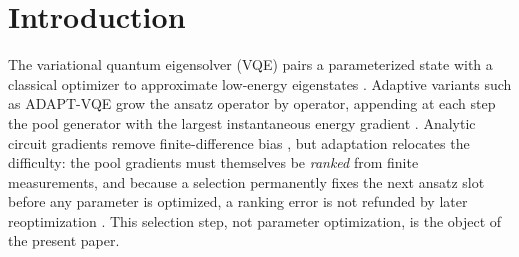 \documentclass[aps,pra,reprint,superscriptaddress,nofootinbib,floatfix]{revtex4-2}
\newcommand{\Cl}{\mathrm{Cl}}
\newcommand{\C}{\mathbb{C}}
\begin{document}
\begin{abstract}
and QWC grouping cut measured units per step from $42$ to $6$; grouping alone cuts circuit executions $2.8$--$3.6\times$ at unchanged accuracy. On molecules a FAST-inspired determinant-population proxy is intrinsically misaligned with the commutator gradient---its infinite-shot top pick on near-equilibrium H$_4$ carries $8\times10^{-7}$ of the maximum---and plateaus at $33.89$~mHa, above the random arm's median, whereas an exact-gradient baseline reaches $0.393$~mHa. The implementation is a sparse operator-centric realization of the complex Clifford algebra $\Cl(2n,\C)\cong M(2^n,\C)$, which supplies a uniform typed representation rather than additional expressivity. We claim no asymptotic speedup; the contribution is a reproducible, statistically calibrated account of when finite-shot adaptive selection can be certified and when proxy bias cannot be repaired by more measurement.
\end{abstract}

\maketitle

\section{Introduction}
\label{sec:intro}

The variational quantum eigensolver (VQE) pairs a parameterized state with a classical optimizer to approximate low-energy eigenstates \cite{peruzzo2014vqe,mcclean2016theory}. Adaptive variants such as ADAPT-VQE grow the ansatz operator by operator, appending at each step the pool generator with the largest instantaneous energy gradient \cite{grimsley2019adapt,tang2021qubitadapt}. Analytic circuit gradients remove finite-difference bias \cite{mitarai2018qcl,schuld2019gradients,wierichs2022general}, but adaptation relocates the difficulty: the pool gradients must themselves be \emph{ranked} from finite measurements, and because a selection permanently fixes the next ansatz slot before any parameter is optimized, a ranking error is not refunded by later reoptimization \cite{scriva2024challenges}. This selection step, not parameter optimization, is the object of the present paper.
\end{document}
